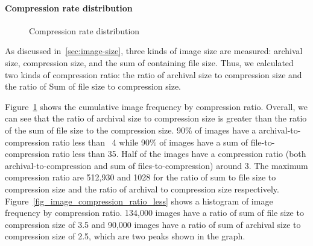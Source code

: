 \paragraph{Compression rate distribution}

\begin{figure}[!t]
	\centering
	\caption{Compression rate distribution}
	\label{fig-image-compression-ratio}
\end{figure}

As discussed in~\ref{sec:image-size}, three kinds of image size are measured: archival size, compression size, and the sum of containing file size. Thus, we calculated two kinds of compression ratio: the ratio of archival size to compression size and the ratio of Sum of file size to compression size. 

Figure~\ref{fig-image-compression-ratio} shows the cumulative image frequency by compression ratio. Overall, we can see that the ratio of archival size to compression size is greater than the ratio of the sum of file size to the compression size. 90\% of images have a archival-to-compression ratio less than ~4 while 90\% of images have a sum of file-to-compression ratio less than 35. Half of the images have a compression ratio (both archival-to-compression and sum of files-to-compression) around 3. The maximum compression ratio are 512,930 and 1028 for the ratio of sum to file size to compression size and the ratio of archival to compression size respectively.
Figure~\ref{fig_image_compression_ratio_less} shows a histogram of image frequency by compression ratio. 134,000 images have a ratio of sum of file size to compression size of 3.5 and 90,000 images have a ratio of sum of archival size to compression size of 2.5, which are two peaks shown in the graph.

